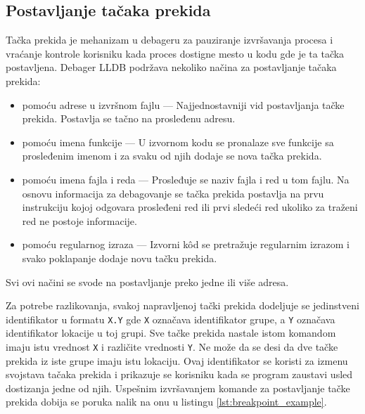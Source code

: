 \documentclass[12pt,oneside]{memoir}
\begin{document}
\subsection{Postavljanje tačaka prekida}

Tačka prekida je mehanizam u debageru za pauziranje izvršavanja procesa i vraćanje kontrole korisniku kada proces dostigne mesto u kodu gde je ta tačka postavljena.
Debager LLDB podržava nekoliko načina za postavljanje tačaka prekida:
\begin{itemize}
  \item pomoću adrese u izvršnom fajlu --- Najjednostavniji vid postavljanja tačke prekida. Postavlja se tačno na prosleđenu adresu.
  \item pomoću imena funkcije --- U izvornom kodu se pronalaze sve funkcije sa prosleđenim imenom i za svaku od njih dodaje se nova tačka prekida.
  \item pomoću imena fajla i reda --- Prosleđuje se naziv fajla i red u tom fajlu. Na osnovu informacija za debagovanje se tačka prekida postavlja na prvu instrukciju kojoj odgovara prosleđeni red ili prvi sledeći red ukoliko za traženi red ne postoje informacije.
  \item pomoću regularnog izraza --- Izvorni k\^od se pretražuje regularnim izrazom i svako poklapanje dodaje novu tačku prekida.
\end{itemize}
Svi ovi načini se svode na postavljanje preko jedne ili više adresa.

Za potrebe razlikovanja, svakoj napravljenoj tački prekida dodeljuje se jedinstveni identifikator u formatu \verb|X.Y| gde \verb|X| označava identifikator grupe, a \verb|Y| označava identifikator lokacije u toj grupi.
Sve tačke prekida nastale istom komandom imaju istu vrednost \verb|X| i različite vrednosti \verb|Y|.
Ne može da se desi da dve tačke prekida iz iste grupe imaju istu lokaciju.
Ovaj identifikator se koristi za izmenu svojstava tačaka prekida i prikazuje se korisniku kada se program zaustavi usled dostizanja jedne od njih.
Uspešnim izvršavanjem komande za postavljanje tačke prekida dobija se poruka nalik na onu u listingu \ref{lst:breakpoint_example}.
\end{document}
